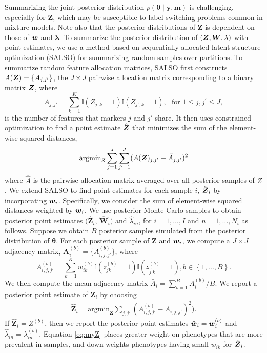 \documentclass[12pt,]{article}
\newcommand{\bc}[1]{ \left\{#1\right\} }
\def\btheta{\bm{\theta}}
\def\y{\bm{y}}
\newcommand\m{\bm{m}}
\newcommand{\Ind}[1]{\mathbbm{1}\bc{#1}}
\def\Z{\bm{Z}}
\newcommand{\bZ}{\mbox{\boldmath $Z$}}
\newcommand{\bw}{\mbox{\boldmath $w$}}
\newcommand{\bW}{\mbox{\boldmath $W$}}
\begin{document}
Summarizing the joint posterior distribution $p(\btheta \mid \y, \m)$ is
challenging, especially for $\Z$, which may be susceptible to label switching
problems common in mixture models. Note also that the posterior distributions
of $\Z$ is dependent on those of $\bw$ and $\bm \lambda$. To summarize the
posterior distribution of $(\Z,\bW,\lambda)$ with point estimates, we use a
method based on sequentially-allocated latent structure optimization (SALSO)
\citep{salso} for summarizing random samples over partitions. To summarize
random feature allocation matrices, SALSO first constructs
$A(\bZ)=\{A_{j,j'}\}$, the $J \times J$ pairwise allocation matrix
corresponding to a binary matrix $\bZ$, where  
$$
A_{j,j'} = \sum_{k=1}^K \mathbb{I}(Z_{j,k}=1)\mathbb{I}(Z_{j',k}=1),
~~~\text{for } 1\leq j, j^\prime \leq J,
$$
is the number of features that markers $j$ and $j'$ share. It then uses
constrained optimization to find a point estimate $\hat{\bZ}$ that
minimizes the sum of the element-wise squared distances, 
\begin{eqnarray*}
\text{argmin}_Z\sum_{j=1}^J\sum_{j'=1}^J(A(\bZ)_{j,j'} - \bar{A}_{j,j'})^2
\label{eq:salso}
\end{eqnarray*}
%
where $\hat A$ is the pairwise allocation matrix averaged over all posterior
samples of $Z$.  %
%
We extend SALSO to find point estimates for each sample $i$, $\hat{\bZ}_i$ by
incorporating $\bw_i$. Specifically, we consider the sum of element-wise squared
distances weighted by $\bw_i$.  We use posterior Monte Carlo samples to obtain
posterior point estimates $(\hat{\Z}_i$, $\hat{\bm W}_i)$ and
$\hat{\lambda}_{in}$, for $i=1, \ldots, I$ and $n=1, \ldots, N_i$ as follows.
Suppose we obtain \(B\) posterior samples simulated from the posterior
distribution of \(\btheta\). For each posterior sample of \(\Z\) and \(\bw_i\),
we compute a $J \times J$ adjacency matrix, \(\bm A_i^{(b)}
=\{A^{(b)}_{i,j,j'}\}\), where 
%
\[
A^{(b)}_{i,j,j'} = \sum_{k=1}^K w^{(b)}_{ik} 
\mathbb{I}\left( z^{(b)}_{jk} = 1\right)
\mathbb{I}\left(z^{(b)}_{j^\prime k} = 1\right), b \in \bc{1,...,B}.
\]
We then compute the mean adjacency matrix \(\bar A_i = \sum_{b=1}^B A_i^{(b)} /
B\).  We report a posterior point estimate of $\Z_i$ by choosing
\begin{eqnarray}
\hat{\bm Z}_i = \text{argmin}_{\bm Z} \sum_{j,j'} (A_{i,j,j'}^{(b)} - \bar
A_{i,j,j'})^2).\label{eq:myZ}
\end{eqnarray}
If $\hat{\Z}_i = Z^{(b)}$, then we report the posterior point estimates
$\hat{\bw}_i=\bw_i^{(b)}$ and $\hat{\lambda}_{in}=\lambda_{in}^{(b)}$.
Equation \eqref{eq:myZ} places greater weight on phenotypes that are more
prevalent in samples, and down-weights phenotypes having small $w_{ik}$ for
$\hat{\bZ}_i$.
\end{document}
